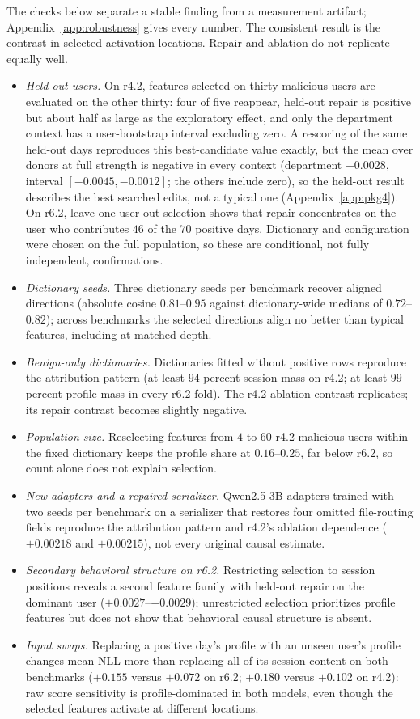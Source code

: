 \documentclass[10pt]{article} %
\begin{document}
The checks below separate a stable finding from a measurement artifact;
Appendix~\ref{app:robustness} gives every number. The consistent result is
the contrast in selected activation locations. Repair and ablation do not
replicate equally well.
\begin{itemize}[leftmargin=1.3em]
\item \emph{Held-out users.} On r4.2, features selected on thirty malicious
users are evaluated on the other thirty: four of five reappear, held-out
repair is positive but about half as large as the exploratory effect, and only
the department context has a user-bootstrap interval excluding zero. A
rescoring of the same held-out days reproduces this best-candidate value
exactly, but the mean over donors at full strength is negative in every
context (department $-0.0028$, interval $[-0.0045, -0.0012]$; the others
include zero), so the held-out result describes the best searched edits, not
a typical one (Appendix~\ref{app:pkg4}). On r6.2,
leave-one-user-out selection shows that repair concentrates on the user who
contributes $46$ of the $70$ positive days. Dictionary and configuration were
chosen on the full population, so these are conditional, not fully
independent, confirmations.
\item \emph{Dictionary seeds.} Three dictionary seeds per benchmark recover
aligned directions (absolute cosine $0.81$--$0.95$ against dictionary-wide
medians of $0.72$--$0.82$); across benchmarks the selected directions align
no better than typical features, including at matched depth.
\item \emph{Benign-only dictionaries.} Dictionaries fitted without positive
rows reproduce the attribution pattern (at least $94$ percent session mass on
r4.2; at least $99$ percent profile mass in every r6.2 fold). The r4.2
ablation contrast replicates; its repair contrast becomes slightly negative.
\item \emph{Population size.} Reselecting features from $4$ to $60$ r4.2
malicious users within the fixed dictionary keeps the profile share at
$0.16$--$0.25$, far below r6.2, so count alone does not explain selection.
\item \emph{New adapters and a repaired serializer.} Qwen2.5-3B adapters
trained with two seeds per benchmark on a serializer that restores four
omitted file-routing fields reproduce the attribution pattern and r4.2's
ablation dependence ($+0.00218$ and $+0.00215$), not every original causal
estimate.
\item \emph{Secondary behavioral structure on r6.2.} Restricting selection to
session positions reveals a second feature family with held-out repair on the
dominant user ($+0.0027$--$+0.0029$); unrestricted selection prioritizes
profile features but does not show that behavioral causal structure is
absent.
\item \emph{Input swaps.} Replacing a positive day's profile with an unseen
user's profile changes mean NLL more than replacing all of its session content
on both benchmarks ($+0.155$ versus $+0.072$ on r6.2; $+0.180$ versus $+0.102$
on r4.2): raw score sensitivity is profile-dominated in both models, even
though the selected features activate at different locations.
\end{itemize}
\end{document}

